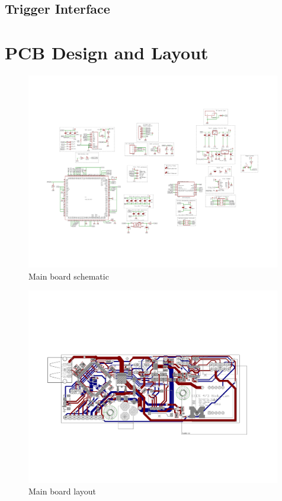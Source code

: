 \documentclass[12pt]{article}
\begin{document}
\newpage

\subsection{Trigger Interface}


\newpage

\section{PCB Design and Layout}

\begin{figure}[h]
    \centering
    \includegraphics[angle=-90,width=0.99\textwidth]{BodyCamBoard_sch}
    \caption{Main board schematic}
\end{figure}

\begin{figure}[h]
    \centering
    \includegraphics[angle=-90,width=0.99\textwidth]{BodyCamBoard_brd}
    \caption{Main board layout}
\end{figure}
\end{document}
